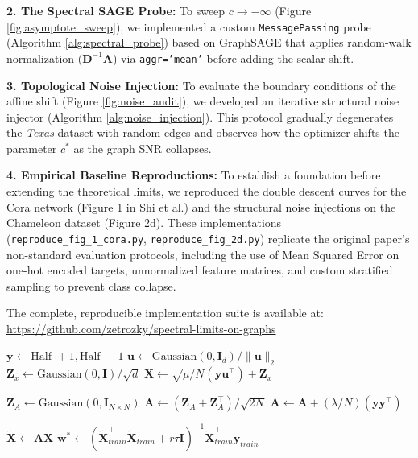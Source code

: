 \documentclass[10pt]{article}
\begin{document}
\textbf{2. The Spectral SAGE Probe:} To sweep $c \to -\infty$ (Figure \ref{fig:asymptote_sweep}), we implemented a custom \texttt{MessagePassing} probe (Algorithm \ref{alg:spectral_probe}) based on GraphSAGE that applies random-walk normalization ($\mathbf{D}^{-1}\mathbf{A}$) via \texttt{aggr='mean'} before adding the scalar shift.

\textbf{3. Topological Noise Injection:} To evaluate the boundary conditions of the affine shift (Figure \ref{fig:noise_audit}), we developed an iterative structural noise injector (Algorithm \ref{alg:noise_injection}).
This protocol gradually degenerates the \textit{Texas} dataset with random edges and observes how the optimizer shifts the parameter $c^*$ as the graph SNR collapses.

\textbf{4. Empirical Baseline Reproductions:} To establish a foundation before extending the theoretical limits, we reproduced the double descent curves for the Cora network (Figure 1 in Shi et al.) and the structural noise injections on the Chameleon dataset (Figure 2d). These implementations (\texttt{reproduce\_fig\_1\_cora.py}, \texttt{reproduce\_fig\_2d.py}) replicate the original paper's non-standard evaluation protocols, including the use of Mean Squared Error on one-hot encoded targets, unnormalized feature matrices, and custom stratified sampling to prevent class collapse.

The complete, reproducible implementation suite is available at: \url{https://github.com/zetrozky/spectral-limits-on-graphs}

\begin{algorithm}[H]
\caption{CSBM Generation \& Ridge Evaluation (\texttt{reproduce\_fig\_3b.py})}
\label{alg:csbm}
\BlankLine
{}
$\mathbf{y} \leftarrow \text{Half } +1, \text{Half } -1$\;
$\mathbf{u} \leftarrow \text{Gaussian}(0, \mathbf{I}_d) / \|\mathbf{u}\|_2$\;
$\mathbf{Z}_x \leftarrow \text{Gaussian}(0, \mathbf{I}) / \sqrt{d}$\;
$\mathbf{X} \leftarrow \sqrt{\mu / N} (\mathbf{y} \mathbf{u}^\top) + \mathbf{Z}_x$\;

\BlankLine
{}
$\mathbf{Z}_A \leftarrow \text{Gaussian}(0, \mathbf{I}_{N \times N})$\;
$\mathbf{A} \leftarrow (\mathbf{Z}_A + \mathbf{Z}_A^\top) / \sqrt{2N}$\;
$\mathbf{A} \leftarrow \mathbf{A} + (\lambda / N)(\mathbf{y} \mathbf{y}^\top)$\;

\BlankLine
{}
$\tilde{\mathbf{X}} \leftarrow \mathbf{A}\mathbf{X}$ 
$\mathbf{w}^* \leftarrow (\tilde{\mathbf{X}}_{train}^\top \tilde{\mathbf{X}}_{train} + r\tau\mathbf{I})^{-1} \tilde{\mathbf{X}}_{train}^\top \mathbf{y}_{train}$\;
\;
\end{algorithm}
\end{document}
